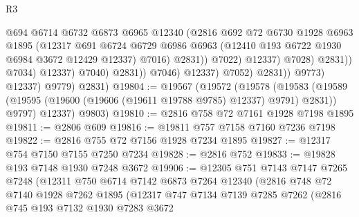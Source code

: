 \begin{lexlean}{R3}
\begin{coremodule}
                                            @694
                                            @6714
                                            @6732
                                            @6873
                                            @6965
                                            @12340
                                            (@2816
                                              @692
                                              @72
                                              @6730
                                              @1928
                                              @6963
                                              @1895
                                              (@12317
                                                @691
                                                @6724
                                                @6729
                                                @6986
                                                @6963
                                                (@12410 @193 @6722 @1930 @6984 @3672 @12429 @12337)
                                                @7016)
                                              @2831))
                                          @7022)
                                        @12337)
                                      @7028)
                                    @2831))
                                @7034)
                              @12337)
                            @7040)
                          @2831))
                      @7046)
                    @12337)
                  @7052)
                @2831))
            @9773)
          @12337)
        @9779)
      @2831)
@19804 := @19567
    (@19572
      (@19578
        (@19583 (@19589 (@19595 (@19600 (@19606 (@19611 @19788 @9785) @12337) @9791) @2831)) @9797)
        @12337)
      @9803)
@19810 := @2816 @758 @72 @7161 @1928 @7198 @1895
@19811 := @2806 @609
@19816 := @19811 @757 @7158 @7160 @7236 @7198
@19822 := @2816 @755 @72 @7156 @1928 @7234 @1895
@19827 := @12317 @754 @7150 @7155 @7250 @7234
@19828 := @2816 @752
@19833 := @19828 @193 @7148 @1930 @7248 @3672
@19906 := @12305
    @751
    @7143
    @7147
    @7265
    @7248
    (@12311
      @750
      @6714
      @7142
      @6873
      @7264
      @12340
      (@2816
        @748
        @72
        @7140
        @1928
        @7262
        @1895
        (@12317
          @747
          @7134
          @7139
          @7285
          @7262
          (@2816
            @745
            @193
            @7132
            @1930
            @7283
            @3672

\end{coremodule}
\end{lexlean}
